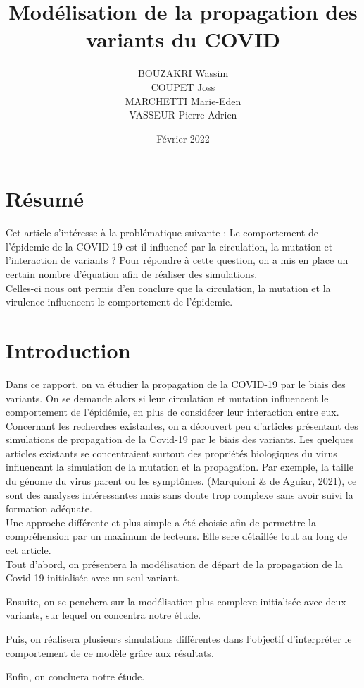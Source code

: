 \documentclass{article}
\title{Modélisation de la propagation des variants du COVID}
\author{BOUZAKRI Wassim \\COUPET Joss \\MARCHETTI Marie-Eden \\VASSEUR Pierre-Adrien}
\date{Février 2022}
\begin{document}
\maketitle

\section{Résumé}

Cet article s'intéresse à la problématique suivante : Le comportement de l'épidemie de la COVID-19 est-il influencé par la circulation, la mutation et l'interaction de variants ?
Pour répondre à cette question, on a mis en place un certain nombre d'équation afin de réaliser des simulations. \\Celles-ci nous ont permis d'en conclure que la circulation, la mutation et la virulence influencent le comportement de l'épidemie.

\section{Introduction}

Dans ce rapport, on va étudier la propagation de la COVID-19 par le biais des variants.
On se demande alors si leur circulation et mutation influencent le comportement de l'épidémie, en plus de considérer leur interaction entre eux.\\

\noindent
Concernant les recherches existantes, on a découvert peu d'articles présentant des simulations de propagation de la Covid-19 par le biais des variants.
Les quelques articles existants se concentraient surtout des propriétés biologiques du virus influencant la simulation de la mutation et la propagation.
Par exemple, la taille du génome du virus parent ou les symptômes. (Marquioni \& de Aguiar, 2021), ce sont des analyses intéressantes mais sans doute trop complexe sans avoir suivi la formation adéquate.\\

\noindent
Une approche différente et plus simple a été choisie afin de permettre la compréhension par un maximum de lecteurs. Elle sere détaillée tout au long de cet article.\\

\noindent
Tout d'abord, on présentera la modélisation de départ de la propagation de la Covid-19 initialisée avec un seul variant. \par
\noindent
Ensuite, on se penchera sur la modélisation plus complexe initialisée avec deux variants, sur lequel on concentra notre étude.\par
\noindent
Puis, on réalisera plusieurs simulations différentes dans l'objectif d'interpréter le comportement de ce modèle grâce aux résultats.\par
\noindent
Enfin, on concluera notre étude.\\
\end{document}
